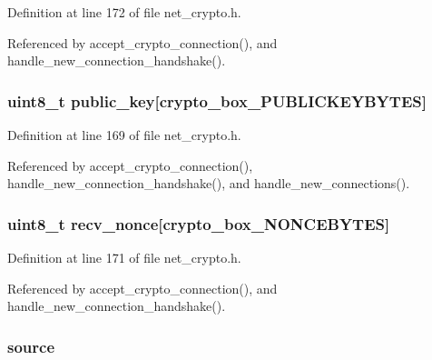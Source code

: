 Definition at line 172 of file net\+\_\+crypto.\+h.



Referenced by accept\+\_\+crypto\+\_\+connection(), and handle\+\_\+new\+\_\+connection\+\_\+handshake().

\hypertarget{struct_new___connection_aaa806bb1136fb3d4b5d8d8970b596ff7}{
\subsubsection[{public\+\_\+key}]{\setlength{\rightskip}{0pt plus 5cm}uint8\+\_\+t public\+\_\+key\mbox{[}crypto\+\_\+box\+\_\+\+P\+U\+B\+L\+I\+C\+K\+E\+Y\+B\+Y\+T\+E\+S\mbox{]}}}\label{struct_new___connection_aaa806bb1136fb3d4b5d8d8970b596ff7}


Definition at line 169 of file net\+\_\+crypto.\+h.



Referenced by accept\+\_\+crypto\+\_\+connection(), handle\+\_\+new\+\_\+connection\+\_\+handshake(), and handle\+\_\+new\+\_\+connections().

\hypertarget{struct_new___connection_aae0467706f97aa3ef23e5dc9c3c199d7}{
\subsubsection[{recv\+\_\+nonce}]{\setlength{\rightskip}{0pt plus 5cm}uint8\+\_\+t recv\+\_\+nonce\mbox{[}crypto\+\_\+box\+\_\+\+N\+O\+N\+C\+E\+B\+Y\+T\+E\+S\mbox{]}}}\label{struct_new___connection_aae0467706f97aa3ef23e5dc9c3c199d7}


Definition at line 171 of file net\+\_\+crypto.\+h.



Referenced by accept\+\_\+crypto\+\_\+connection(), and handle\+\_\+new\+\_\+connection\+\_\+handshake().

\hypertarget{struct_new___connection_afffde330c649378add9a507c9c151586}{
\subsubsection[{source}]{ source}}\label{struct_new___connection_afffde330c649378add9a507c9c151586}


